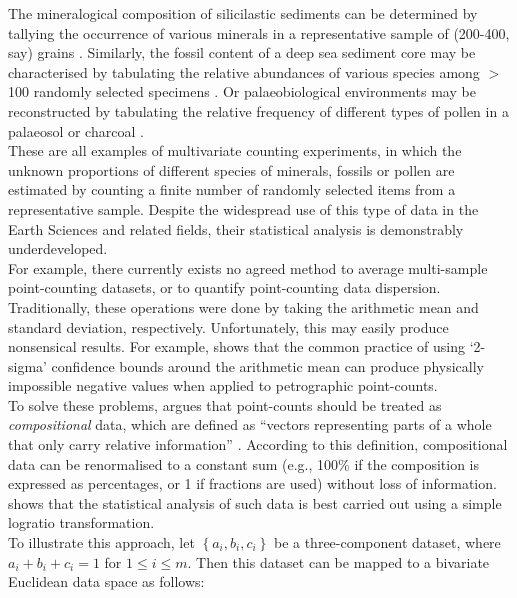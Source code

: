 \documentclass{article}
\begin{document}
The mineralogical composition of silicilastic sediments can be
determined by tallying the occurrence of various minerals in a
representative sample of (200-400, say) grains \citep{dryden1931,
  vanderplas1965, weltje2002}. Similarly, the fossil content of a deep
sea sediment core may be characterised by tabulating the relative
abundances of various species among $>$100 randomly selected specimens
\citep{patterson1989, buzas1990, fatela2002}. Or palaeobiological
environments may be reconstructed by tabulating the relative frequency
of different types of pollen in a palaeosol or charcoal
\citep{barkley1934, clark1982, weng2006}.\\

These are all examples of multivariate counting experiments, in which
the unknown proportions of different species of minerals, fossils or
pollen are estimated by counting a finite number of randomly selected
items from a representative sample. Despite the widespread use of this
type of data in the Earth Sciences and related fields, their
statistical analysis is demonstrably underdeveloped.\\

For example, there currently exists no agreed method to average
multi-sample point-counting datasets, or to quantify point-counting
data dispersion. Traditionally, these operations were done by taking
the arithmetic mean and standard deviation, respectively.
Unfortunately, this may easily produce nonsensical results. For
example, \citet{weltje2002} shows that the common practice of using
`2-sigma' confidence bounds around the arithmetic mean can produce
physically impossible negative values when applied to petrographic
point-counts.\\

To solve these problems, \citet{weltje2002} argues that point-counts
should be treated as \emph{compositional} data, which are defined as
``vectors representing parts of a whole that only carry relative
information'' \citep{pawlowsky2011}.  According to this definition,
compositional data can be renormalised to a constant sum (e.g., 100\%
if the composition is expressed as percentages, or 1 if fractions are
used) without loss of information. \citet{aitchison1982,
  aitchison1986} shows that the statistical analysis of such data is
best carried out using a simple logratio transformation.\\

To illustrate this approach, let $\left\{a_i, b_i, c_i\right\}$ be a
three-component dataset, where $a_i + b_i + c_i = 1$ for $1 \leq i
\leq m$. Then this dataset can be mapped to a bivariate Euclidean data
space as follows:
\end{document}
